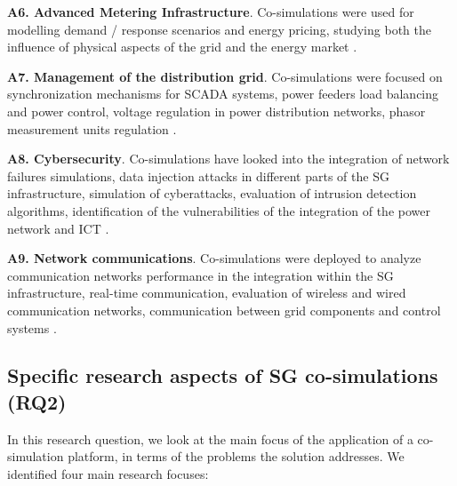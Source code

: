 \documentclass[1p]{elsarticle} %
\begin{document}
\noindent \textbf{A6. Advanced Metering Infrastructure}. Co-simulations were used for modelling demand / response scenarios and energy pricing, studying both the influence of physical aspects of the grid and the energy market .

\noindent \textbf{A7. Management of the distribution grid}. Co-simulations were focused on synchronization mechanisms for SCADA systems, power feeders load balancing and power control, voltage regulation in power distribution networks, phasor measurement units regulation .
 
\noindent \textbf{A8. Cybersecurity}. Co-simulations have looked into the integration of network failures simulations, data injection attacks in different parts of the SG infrastructure, simulation of cyberattacks, evaluation of intrusion detection algorithms, identification of the vulnerabilities of the integration of the power network and ICT . 

\noindent \textbf{A9. Network communications}. Co-simulations were deployed to analyze communication networks performance in the integration within the SG infrastructure, real-time communication, evaluation of wireless and wired communication networks, communication between grid components and control systems .


\subsection{Specific research aspects of SG co-simulations (RQ2)}
In this research question, we look at the main focus of the application of a co-simulation platform, in terms of the problems the solution addresses. We identified four main research focuses:
\end{document}
